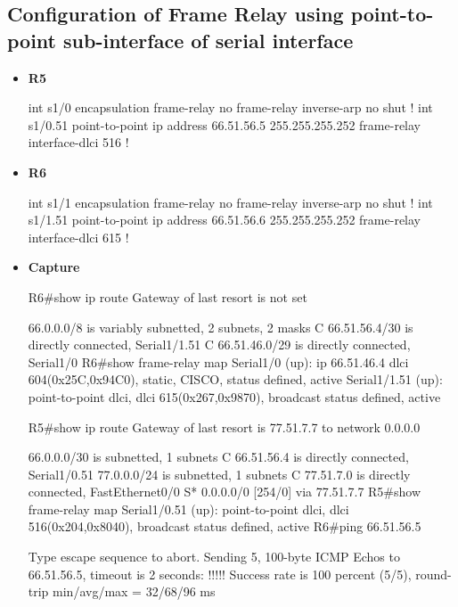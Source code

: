 \documentclass[10pt]{article}
\begin{document}
\subsection{Configuration of Frame Relay using point-to-point sub-interface of serial interface}
\begin{itemize}
\item {\bf R5}
\begin{verbatim*}
int s1/0
 encapsulation frame-relay
 no frame-relay inverse-arp
 no shut
!
int s1/0.51 point-to-point
 ip address 66.51.56.5 255.255.255.252
 frame-relay interface-dlci 516
!
\end{verbatim*}
\item {\bf R6}
\begin{verbatim*}
int s1/1
 encapsulation frame-relay
 no frame-relay inverse-arp
 no shut
!
int s1/1.51 point-to-point
 ip address 66.51.56.6 255.255.255.252
 frame-relay interface-dlci 615
!
\end{verbatim*}
\item {\bf Capture}
\begin{verbatim*}
R6#show ip route
Gateway of last resort is not set

     66.0.0.0/8 is variably subnetted, 2 subnets, 2 masks
C       66.51.56.4/30 is directly connected, Serial1/1.51
C       66.51.46.0/29 is directly connected, Serial1/0
R6#show frame-relay map
Serial1/0 (up): ip 66.51.46.4 dlci 604(0x25C,0x94C0), static,
              CISCO, status defined, active
Serial1/1.51 (up): point-to-point dlci, dlci 615(0x267,0x9870), broadcast
          status defined, active


R5#show ip route
Gateway of last resort is 77.51.7.7 to network 0.0.0.0

     66.0.0.0/30 is subnetted, 1 subnets
C       66.51.56.4 is directly connected, Serial1/0.51
     77.0.0.0/24 is subnetted, 1 subnets
C       77.51.7.0 is directly connected, FastEthernet0/0
S*   0.0.0.0/0 [254/0] via 77.51.7.7
R5#show frame-relay map
Serial1/0.51 (up): point-to-point dlci, dlci 516(0x204,0x8040), broadcast
          status defined, active
R6#ping 66.51.56.5

Type escape sequence to abort.
Sending 5, 100-byte ICMP Echos to 66.51.56.5, timeout is 2 seconds:
!!!!!
Success rate is 100 percent (5/5), round-trip min/avg/max = 32/68/96 ms
\end{verbatim*}
\end{itemize}
\end{document}
